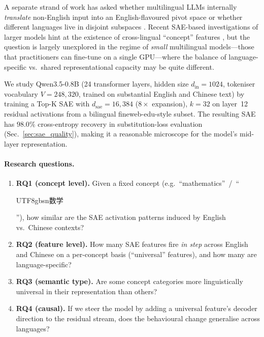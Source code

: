 \documentclass[11pt,a4paper]{article}
\newcommand{\zh}[1]{\begin{CJK*}{UTF8}{gbsn}#1\end{CJK*}}
\begin{document}
A separate strand of work has asked whether multilingual LLMs internally
\emph{translate} non-English input into an English-flavoured pivot space
\cite{wendler2024llamasenglish} or whether different languages live in
disjoint subspaces \cite{conneau2020unsupervised}. Recent SAE-based
investigations of larger models hint at the existence of cross-lingual
``concept'' features \cite{templeton2024scalingmonosemanticity}, but the
question is largely unexplored in the regime of \emph{small} multilingual
models---those that practitioners can fine-tune on a single GPU---where the
balance of language-specific vs.\ shared representational capacity may be
quite different.

We study Qwen3.5-0.8B \cite{qwen3_5_2025} (24 transformer layers, hidden size
$d_\text{in}{=}1024$, tokeniser vocabulary $V{=}248{,}320$, trained on
substantial English and Chinese text) by training a Top-K SAE
\cite{gao2024scalingsae} with $d_\text{sae}{=}16{,}384$ ($8\times$ expansion),
$k=32$ on layer~12 residual activations from a bilingual
fineweb-edu-style subset. The resulting SAE has $98.0\%$ cross-entropy
recovery in substitution-loss evaluation
(Sec.~\ref{sec:sae_quality}), making it a reasonable
microscope for the model's mid-layer representation.

\paragraph{Research questions.}
\begin{enumerate}
\item \textbf{RQ1 (concept level).} Given a fixed concept (e.g.\
``mathematics''~/~``\zh{数学}''), how similar are the SAE activation patterns
induced by English vs.\ Chinese contexts?
\item \textbf{RQ2 (feature level).} How many SAE features fire \emph{in step}
across English and Chinese on a per-concept basis (``universal'' features),
and how many are language-specific?
\item \textbf{RQ3 (semantic type).} Are some concept categories more
linguistically universal in their representation than others?
\item \textbf{RQ4 (causal).} If we steer the model by adding a universal
feature's decoder direction to the residual stream, does the behavioural
change generalise across languages?
\end{enumerate}
\end{document}
